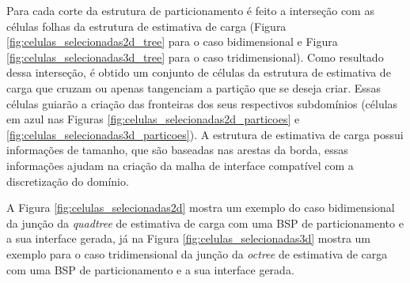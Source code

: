 Para cada corte da estrutura de particionamento é feito a interseção com as células folhas da estrutura de estimativa de carga (Figura \ref{fig:celulas_selecionadas2d_tree} para o caso bidimensional e Figura \ref{fig:celulas_selecionadas3d_tree} para o caso tridimensional). Como resultado dessa interseção, é obtido um conjunto de células da estrutura de estimativa de carga que cruzam ou apenas tangenciam a partição que se deseja criar. Essas células guiarão a criação das fronteiras dos seus respectivos subdomínios (células em azul nas Figuras \ref{fig:celulas_selecionadas2d_particoes} e \ref{fig:celulas_selecionadas3d_particoes}). A estrutura de estimativa de carga possui informações de tamanho, que são baseadas nas arestas da borda, essas informações ajudam na criação da malha de interface compatível com a discretização do domínio.

A Figura \ref{fig:celulas_selecionadas2d} mostra um exemplo do caso bidimensional da junção da \textit{quadtree} de estimativa de carga com uma BSP de particionamento e a sua interface gerada, já na Figura \ref{fig:celulas_selecionadas3d} mostra um exemplo para o caso tridimensional da junção da \textit{octree} de estimativa de carga com uma BSP de particionamento e a sua interface gerada.

